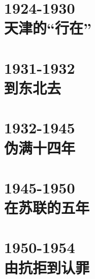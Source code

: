 \documentclass[oneside,openright,headings=optiontohead]{scrbook}
\begin{document}
{\part{1924-1930\\\hspace{1cm}天津的“行在”}







\part{1931-1932\\\hspace{1cm}到东北去}







\part{1932-1945\\\hspace{1cm}伪满十四年}










\part{1945-1950\\\hspace{1cm}在苏联的五年}



\part{1950-1954\\\hspace{1cm}由抗拒到认罪}











}
\end{document}
